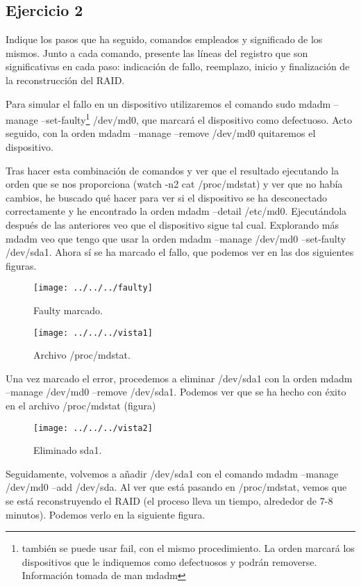 \documentclass[a4paper, 11pt]{article} %
\begin{document}
\subsection{Ejercicio 2}
Indique los pasos que ha seguido, comandos empleados y significado de los mismos. Junto a cada comando, presente las líneas del registro que son significativas en cada paso: indicación de fallo, reemplazo, inicio y finalización de la reconstrucción del RAID.

Para simular el fallo en un dispositivo utilizaremos el comando sudo mdadm --manage --set-faulty\footnote{también se puede usar fail, con el mismo procedimiento. La orden marcará los dispositivos que le indiquemos como defectuosos y podrán removerse. Información tomada de man mdadm} /dev/md0, que marcará el dispositivo como defectuoso. Acto seguido, con la orden mdadm --manage --remove /dev/md0 quitaremos el dispositivo. 

Tras hacer esta combinación de comandos y ver que el resultado ejecutando la orden que se nos proporciona (watch -n2 cat /proc/mdstat) y ver que no había cambios, he buscado qué hacer para ver si el dispositivo se ha desconectado correctamente y he encontrado la orden mdadm --detail /etc/md0. Ejecutándola después de las anteriores veo que el dispositivo sigue tal cual. Explorando más mdadm veo que tengo que usar la orden mdadm --manage /dev/md0 --set-faulty /dev/sda1. Ahora sí se ha marcado el fallo, que podemos ver en las dos siguientes figuras. 
\pagebreak

\begin{figure}[htpb]
\centering
\texttt{[image: ../../../faulty]}
\caption{Faulty marcado.}
\end{figure}

\begin{figure}[htpb]
\centering
\texttt{[image: ../../../vista1]}
\caption{Archivo /proc/mdstat.}
\end{figure}

Una vez marcado el error, procedemos a eliminar /dev/sda1 con la orden mdadm --manage /dev/md0 --remove /dev/sda1. Podemos ver que se ha hecho con éxito en el archivo /proc/mdstat (figura) 

\pagebreak

\begin{figure}[htpb]
\centering
\texttt{[image: ../../../vista2]}
\caption{Eliminado sda1.}
\end{figure}

Seguidamente, volvemos a añadir /dev/sda1 con el comando mdadm --manage /dev/md0 --add /dev/sda. Al ver que está pasando en /proc/mdstat, vemos que se está reconstruyendo el RAID (el proceso lleva un tiempo, alrededor de 7-8 minutos). Podemos verlo en la siguiente figura.
\end{document}
